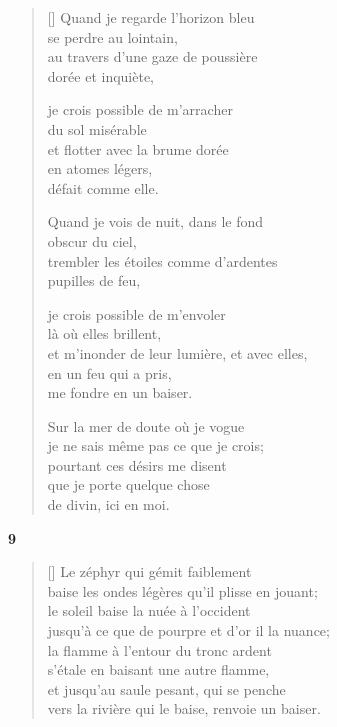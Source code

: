 \documentclass[a4paper,12pt]{book}
\begin{document}
\begin{verse}[\versewidth]
  Quand je regarde l'horizon bleu \\
  se perdre au lointain, \\
  au travers d'une gaze de poussière \\
  dorée et inquiète,

  je crois possible de m'arracher \\
  du sol misérable \\
  et flotter avec la brume dorée \\
  en atomes légers, \\
  défait comme elle.

  Quand je vois de nuit, dans le fond \\
  obscur du ciel, \\
  trembler les étoiles comme d'ardentes \\
  pupilles de feu,

  je crois possible de m'envoler \\
  là où elles brillent, \\
  et m'inonder de leur lumière, et avec elles, \\
  en un feu qui a pris, \\
  me fondre en un baiser.

  Sur la mer de doute où je vogue \\
  je ne sais même pas ce que je crois; \\
  pourtant ces désirs me disent \\
  que je porte quelque chose \\
  de divin, ici en moi.
\end{verse}

\bigskip

\begin{center}
  \textbf{9}
\end{center}

\settowidth{\versewidth}{jusqu'à ce que de pourpre et d'or il la nuance;}

\begin{verse}[\versewidth]
  Le zéphyr qui gémit faiblement \\
  baise les ondes légères qu'il plisse en jouant; \\
  le soleil baise la nuée à l'occident \\
  jusqu'à ce que de pourpre et d'or il la nuance; \\
  la flamme à l'entour du tronc ardent \\
  s'étale en baisant une autre flamme, \\
  et jusqu'au saule pesant, qui se penche \\
  vers la rivière qui le baise, renvoie un baiser.
\end{verse}
\end{document}
